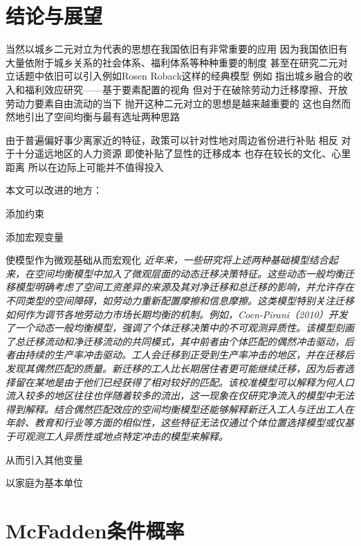 \documentclass[a4paper,12pt,oneside, fontset=mac]{ctexbook} %
\begin{document}
\chapter{结论与展望}

当然以城乡二元对立为代表的思想在我国依旧有非常重要的应用 因为我国依旧有大量依附于城乡关系的社会体系、福利体系等种种重要的制度
甚至在研究二元对立话题中依旧可以引入例如Rosen Roback这样的经典模型
例如 
\cite{GuoDongMeiChengXiangRongHeDeShouRuHeFuLiXiaoYingYanJiuJiYuYaoSuPeiZhiDeShiJiao2023}指出城乡融合的收入和福利效应研究——基于要素配置的视角
但对于在破除劳动力迁移摩擦、开放劳动力要素自由流动的当下
抛开这种二元对立的思想是越来越重要的
这也自然而然地引出了空间均衡与最有选址两种思路



由于普遍偏好事少离家近的特征，政策可以针对性地对周边省份进行补贴
相反 对于十分遥远地区的人力资源 即使补贴了显性的迁移成本 也存在较长的文化、心里距离 所以在边际上可能并不值得投入



本文可以改进的地方：

添加约束

添加宏观变量

使模型作为微观基础从而宏观化
\textit{近年来，一些研究将上述两种基础模型结合起来，在空间均衡模型中加入了微观层面的动态迁移决策特征。这些动态一般均衡迁移模型明确考虑了空间工资差异的来源及其对净迁移和总迁移的影响，并允许存在不同类型的空间障碍，如劳动力重新配置摩擦和信息摩擦。这类模型特别关注迁移如何作为调节各地劳动力市场长期均衡的机制。例如，Coen-Pirani（2010）开发了一个动态一般均衡模型，强调了个体迁移决策中的不可观测异质性。该模型刻画了总迁移流动和净迁移流动的共同模式，其中前者由个体匹配的偶然冲击驱动，后者由持续的生产率冲击驱动。工人会迁移到正受到生产率冲击的地区，并在迁移后发现其偶然匹配的质量。新迁移的工人比长期居住者更可能继续迁移，因为后者选择留在某地是由于他们已经获得了相对较好的匹配。该校准模型可以解释为何人口流入较多的地区往往也伴随着较多的流出，这一现象在仅研究净流入的模型中无法得到解释。结合偶然匹配效应的空间均衡模型还能够解释新迁入工人与迁出工人在年龄、教育和行业等方面的相似性，这些特征无法仅通过个体位置选择模型或仅基于可观测工人异质性或地点特定冲击的模型来解释。}

从而引入其他变量

以家庭为基本单位


\newpage
\appendix

\chapter{McFadden条件概率}
\end{document}
